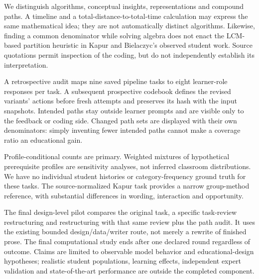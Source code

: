 We distinguish algorithms, conceptual insights, representations and compound paths. A timeline and a total-distance-to-total-time calculation may express the same mathematical idea; they are not automatically distinct algorithms. Likewise, finding a common denominator while solving algebra does not enact the LCM-based partition heuristic in Kapur and Bielaczyc's observed student work. Source quotations permit inspection of the coding, but do not independently establish its interpretation.

A retrospective audit maps nine saved pipeline tasks to eight learner-role responses per task. A subsequent prospective codebook defines the revised variants' actions before fresh attempts and preserves its hash with the input snapshots. Intended paths stay outside learner prompts and are visible only to the feedback or coding side. Changed path sets are displayed with their own denominators: simply inventing fewer intended paths cannot make a coverage ratio an educational gain.

Profile-conditional counts are primary. Weighted mixtures of hypothetical prerequisite profiles are sensitivity analyses, not inferred classroom distributions. We have no individual student histories or category-frequency ground truth for these tasks. The source-normalized Kapur task provides a narrow group-method reference, with substantial differences in wording, interaction and opportunity.

The final design-level pilot compares the original task, a specific task-review restructuring and restructuring with that same review plus the path audit. It uses the existing bounded design/data/writer route, not merely a rewrite of finished prose. The final computational study ends after one declared round regardless of outcome. Claims are limited to observable model behavior and educational-design hypotheses; realistic student populations, learning effects, independent expert validation and state-of-the-art performance are outside the completed component.
